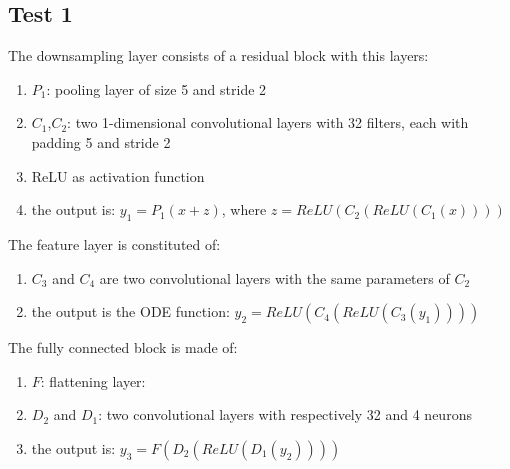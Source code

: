 \documentclass[LaM,binding=0.6cm]{sapthesis}
\begin{document}
\subsection{Test 1}
The downsampling layer consists of a residual block with this layers:
\begin{enumerate}
\item $P_1$: pooling layer of size 5 and stride 2
\item $C_1$,$C_2$: two 1-dimensional convolutional layers with 32 filters, each with padding 5 and stride 2
\item ReLU as activation function
\item the output is: $y_1=P_1(x+z)$, where $z=ReLU(C_2(ReLU(C_1(x))))$
\end{enumerate}
The feature layer is constituted of:
\begin{enumerate}
\item $C_3$ and $C_4$ are two convolutional layers with the same parameters of $C_2$
\item the output is the ODE function: $y_2=ReLU(C_4(ReLU(C_3(y_1))))$
\end{enumerate}
The fully connected block is made of:
\begin{enumerate}
\item $F$: flattening layer: 
\item $D_2$ and $D_1$:  two convolutional layers with respectively 32 and 4 neurons
\item the output is: $y_3=F(D_2(ReLU(D_1(y_2))))$
\end{enumerate}
\end{document}
